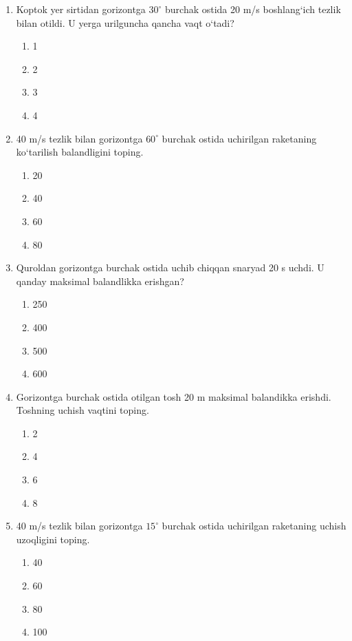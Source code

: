 \begin{enumerate}

\item Koptok yer sirtidan gorizontga $30^\circ$ burchak ostida 20 m/s boshlang‘ich tezlik bilan otildi. U yerga urilguncha qancha vaqt o‘tadi?

\begin{enumerate}[label=\Alph*)]
\item 1
\item 2
\item 3
\item 4
\end{enumerate}

\item 40 m/s tezlik bilan gorizontga $60^\circ$ burchak ostida uchirilgan raketaning ko‘tarilish balandligini toping.

\begin{enumerate}[label=\Alph*)]
\item 20
\item 40
\item 60
\item 80
\end{enumerate}

\item Quroldan gorizontga burchak ostida uchib chiqqan snaryad 20 s uchdi. U qanday maksimal balandlikka erishgan?

\begin{enumerate}[label=\Alph*)]
\item 250
\item 400
\item 500
\item 600
\end{enumerate}

\item Gorizontga burchak ostida otilgan tosh 20 m maksimal balandikka erishdi. Toshning uchish vaqtini toping.

\begin{enumerate}[label=\Alph*)]
\item 2
\item 4
\item 6
\item 8
\end{enumerate}

\item 40 m/s tezlik bilan gorizontga $15^\circ$ burchak ostida uchirilgan raketaning uchish uzoqligini toping.

\begin{enumerate}[label=\Alph*)]
\item 40
\item 60
\item 80
\item 100
\end{enumerate}


\end{enumerate}
